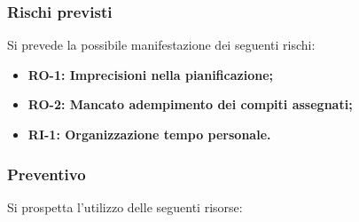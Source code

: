 \documentclass[a4paper,12pt]{article}
\newlength{\namecol}
\begin{document}
    \subsubsection{Rischi previsti}{
        Si prevede la possibile manifestazione dei seguenti rischi:
        \begin{itemize}
            \item \textbf{RO-1: Imprecisioni nella pianificazione;}
            \item \textbf{RO-2: Mancato adempimento dei compiti assegnati;}
            \item \textbf{RI-1: Organizzazione tempo personale.}
        \end{itemize}
    }

    
        \subsubsection{Preventivo}{
            Si prospetta l'utilizzo delle seguenti risorse:

            \begin{table}[H]
                \centering

               \hspace*{-14cm}%



\end{table}}
\end{document}
